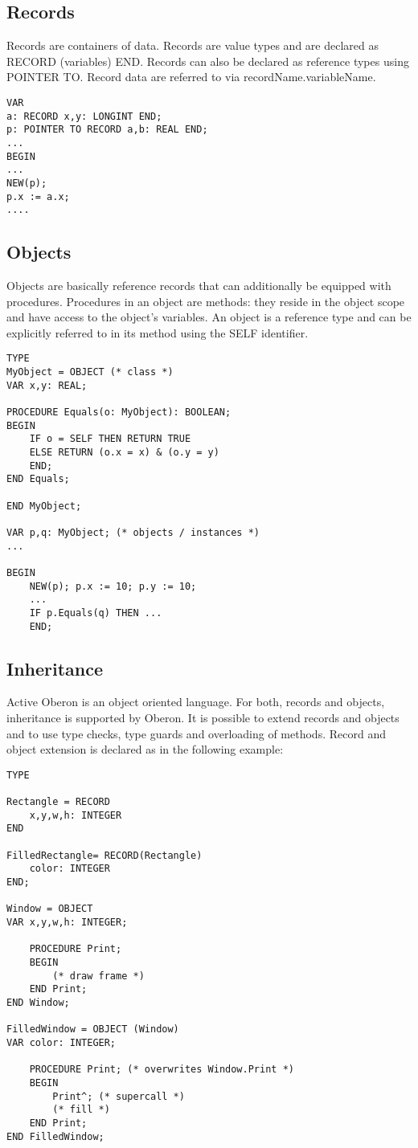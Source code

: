 \documentclass[a4paper,11pt]{article}
\begin{document}
\subsection{Records}
Records are containers of data. Records are value types and are declared as RECORD (variables) END. Records can also be declared as reference types using POINTER TO. Record data are referred to via recordName.variableName.
\begin{lstlisting}[language=Oberon,frame=none]
VAR
a: RECORD x,y: LONGINT END; 
p: POINTER TO RECORD a,b: REAL END; 
...
BEGIN 
...
NEW(p); 
p.x := a.x;
....
\end{lstlisting}    

\subsection{Objects}
Objects are basically reference records that can additionally be equipped with procedures. Procedures in an object are methods: they reside in the object scope and have access to the object's variables. An object is a reference type and can be explicitly referred to in its method using the SELF identifier.
\begin{lstlisting}[language=Oberon,frame=none]
TYPE 
MyObject = OBJECT (* class *) 
VAR x,y: REAL; 

PROCEDURE Equals(o: MyObject): BOOLEAN; 
BEGIN 
    IF o = SELF THEN RETURN TRUE
    ELSE RETURN (o.x = x) & (o.y = y)
    END; 
END Equals; 

END MyObject; 

VAR p,q: MyObject; (* objects / instances *) 
...

BEGIN 
    NEW(p); p.x := 10; p.y := 10; 
    ...
    IF p.Equals(q) THEN ...
    END; 
\end{lstlisting}

\subsection{Inheritance}
Active Oberon is an object oriented language. For both, records and objects, inheritance is supported by Oberon. It is possible to extend records and objects and to use type checks, type guards and overloading of methods. 
Record and object extension is declared as in the following example:

\begin{lstlisting}[language=Oberon,frame=none]
TYPE

Rectangle = RECORD
    x,y,w,h: INTEGER
END

FilledRectangle= RECORD(Rectangle)
    color: INTEGER
END;

Window = OBJECT
VAR x,y,w,h: INTEGER; 

    PROCEDURE Print; 
    BEGIN 
        (* draw frame *) 
    END Print; 
END Window; 

FilledWindow = OBJECT (Window) 
VAR color: INTEGER; 
    
    PROCEDURE Print; (* overwrites Window.Print *) 
    BEGIN 
        Print^; (* supercall *) 
        (* fill *) 
    END Print; 
END FilledWindow; 

\end{lstlisting}
\end{document}
